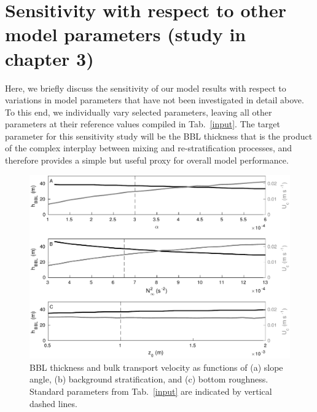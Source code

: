 \chapter{Sensitivity with respect to other model 
parameters (study in chapter 3)}\label{sensitivitystudy}

Here, we briefly discuss the sensitivity of our model results with
respect to variations in model parameters that have not been
investigated in detail above. To this end, we individually vary
selected parameters, leaving all other parameters at their reference
values compiled in Tab.\ \ref{input}. The target parameter for this
sensitivity study will be the BBL thickness that is the product of the
complex interplay between mixing and re-stratification processes, and
therefore provides a simple but useful proxy for overall model
performance.

\begin{figure}
  \noindent\includegraphics[width=35pc]{sensitivity.pdf}
  \caption{BBL thickness and bulk transport velocity as functions of
    (a) slope angle, (b) background stratification, and (c) bottom
    roughness. Standard parameters from Tab.\ \ref{input} are
    indicated by vertical dashed lines. }
  \label{sensitivity}
\end{figure}

